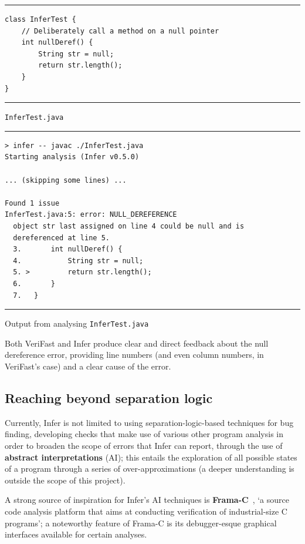 \begin{listing}[!ht]
  \noindent\rule{\textwidth}{0.5pt}
  \begin{verbatim}
class InferTest {
    // Deliberately call a method on a null pointer
    int nullDeref() {
        String str = null;
        return str.length();
    }
}
  \end{verbatim}
  \noindent\rule{\textwidth}{0.5pt}
  \caption{\texttt{InferTest.java}}
  \label{fig:infer-example}
\end{listing}

\begin{listing}[!ht]
  \noindent\rule{\textwidth}{0.5pt}
  \begin{verbatim}
> infer -- javac ./InferTest.java
Starting analysis (Infer v0.5.0)

... (skipping some lines) ...

Found 1 issue
InferTest.java:5: error: NULL_DEREFERENCE
  object str last assigned on line 4 could be null and is
  dereferenced at line 5.
  3.       int nullDeref() {
  4.           String str = null;
  5. >         return str.length();
  6.       }
  7.   }
  \end{verbatim}
  \noindent\rule{\textwidth}{0.5pt}
  \caption{Output from analysing \texttt{InferTest.java}}
  \label{fig:infer-example-output}
\end{listing}

Both VeriFast and Infer produce clear and direct feedback about the null
dereference error, providing line numbers (and even column numbers, in
VeriFast's case) and a clear cause of the error.

\subsection{Reaching beyond separation logic}

Currently, Infer is not limited to using separation-logic-based techniques for
bug finding, developing checks that make use of various other program analysis
in order to broaden the scope of errors that Infer can report, through the use
of \textbf{abstract interpretations} (AI); this entails the exploration of all
possible states of a program through a series of over-approximations (a deeper
understanding is outside the scope of this project).

A strong source of inspiration for Infer's AI techniques is
\textbf{Frama-C}~\cite{frama-c-paper, frama-c-site}, `a source code analysis
platform that aims at conducting verification of industrial-size C programs'; a
noteworthy feature of Frama-C is its debugger-esque graphical interfaces
available for certain analyses.


